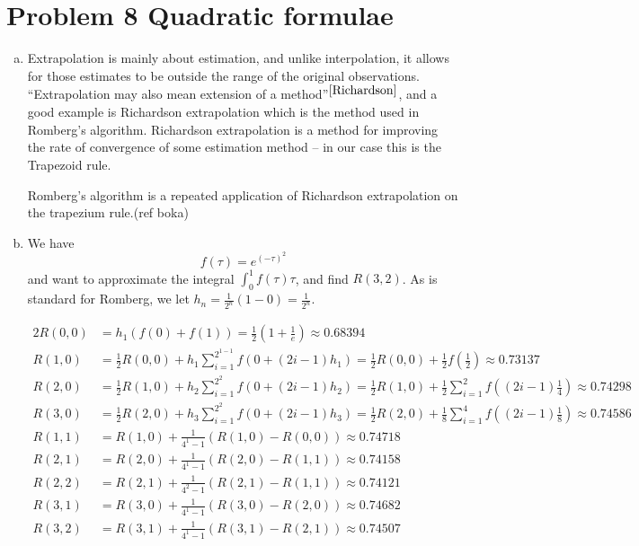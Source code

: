 \section{Problem 8 Quadratic formulae}
\begin{enumerate}[a)]
  \item
Extrapolation is mainly about estimation, and unlike interpolation, it allows for those estimates to be outside the range of the original observations. ``Extrapolation may also mean extension of a method''$^{ \ref{Richardson}}$, and a good example is Richardson extrapolation which is the method used in Romberg's algorithm. Richardson extrapolation is a method for improving the rate of convergence of some estimation method -- in our case this is the Trapezoid rule.


Romberg's algorithm is a repeated application of Richardson extrapolation on the trapezium rule.(ref boka)

  \item
We have
  \begin{equation}
    f(\tau) = e^{(-\tau)^2}
  \end{equation}
and want to approximate the integral $\int_{0}^{1}f(\tau)\tau$, and find $R(3,2)$.
\newline As is standard for Romberg, we let $h_n =\frac{1}{2^n}(1-0)=\frac{1}{2^n} $.

\begin{alignat*}{2}
    R(0,0) &= h_1(f(0)+f(1)) = \frac{1}{2} \left(1+\frac{1}{e} \right) \approx 0.68394\\
    R(1,0) &= \frac{1}{2}R(0,0)+h_1 \sum_{i=1}^{2^{1-1}} f(0+(2i-1)h_1) = \frac{1}{2} R(0,0)+\frac{1}{2} f \left(\frac{1}{2} \right) \approx 0.73137 \\
    R(2,0) &= \frac{1}{2} R(1,0) + h_2 \sum_{i=1}^{2^{2}} f(0+(2i-1)h_2) = \frac{1}{2} R(1,0) + \frac{1}{2} \sum_{i=1}^2 f\left((2i-1)\frac{1}{4}\right) \approx 0.74298 \\
    R(3,0) &= \frac{1}{2} R(2,0)+h_3\sum_{i=1}^{2^{2}} f(0+(2i-1)h_3) = \frac{1}{2} R(2,0)+\frac{1}{8}\sum_{i=1}^4 f\left((2i-1)\frac{1}{8} \right) \approx 0.74586\\
    R(1,1) &= R(1,0) + \frac{1}{4^1-1}\left( R(1,0)-R(0,0) \right) \approx 0.74718 \\
    R(2,1) &= R(2,0) + \frac{1}{4^{1}-1}\left( R(2,0) - R(1,1) \right) \approx 0.74158 \\
    R(2,2) &= R(2,1)+\frac{1}{4^2-1}\left(R(2,1)-R(1,1) \right) \approx 0.74121 \\
    R(3,1) &= R(3,0) + \frac{1}{4^{1}-1}\left(R(3,0)-R(2,0) \right) \approx 0.74682 \\
    R(3,2) &= R(3,1) + \frac{1}{4^{1}-1}\left(R(3,1)-R(2,1) \right) \approx 0.74507
\end{alignat*}

\end{enumerate}


